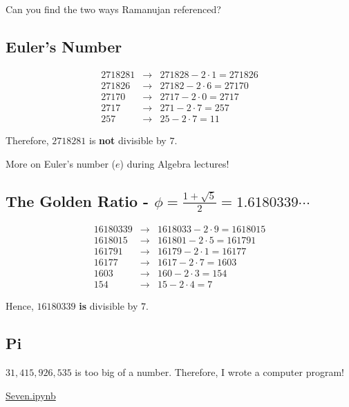 Can you find the two ways Ramanujan referenced?  

\clearpage

\subsection*{Euler's Number}

\begin{eqnarray*}  
	2718281 &\to& 271828-2\cdot 1=271826 \\ 
	271826 &\to& 27182-2\cdot 6=27170 \\
	27170 &\to& 2717-2\cdot 0=2717 \\ 2717 &\to& 271-2\cdot 7=257 \\ 257 &\to& 25-2\cdot 7=11
\end{eqnarray*}

Therefore, $2718281$ is \textbf{not} divisible by $7$.

More on Euler's number ($e$) during Algebra lectures!  

\clearpage

\subsection*{The Golden Ratio - $\phi=\frac{1+\sqrt{5}}{2}=1.6180339\cdots$}

\begin{eqnarray*}
	16180339 &\to& 1618033-2\cdot 9=1618015 \\ 1618015 &\to& 161801-2\cdot 5=161791 \\ 161791 &\to& 16179-2\cdot 1=16177 \\ 16177 &\to& 1617-2\cdot 7=1603 \\ 1603 &\to& 160-2\cdot 3=154 \\ 154 &\to& 15-2\cdot 4=7
\end{eqnarray*}  

Hence, $16180339$ \textbf{is} divisible by $7$.

\clearpage

\subsection*{Pi}

$31,415,926,535$ is too big of a number.  Therefore, I wrote a computer program!

\begin{center} \Huge \href{https://github.com/musichead42/Teaching/blob/master/astar2016wmc/programs/Seven.ipynb}{Seven.ipynb} \end{center}
\normalsize


